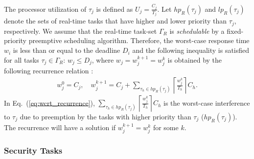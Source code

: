 \documentclass[../rt_server_main.tex]{subfiles}
\begin{document}
The processor utilization of $\tau_j$ is defined as $U_j = \frac{C_j}{T_j}$. Let $hp_R(\tau_j)$ and $lp_R(\tau_j)$ denote the sets of real-time tasks that have higher and lower priority than $\tau_j$, respectively. We assume that the real-time task-set $\Gamma_R$ is \textit{schedulable} by a fixed-priority preemptive scheduling algorithm. Therefore, the worst-case response time %
$w_i$ is less than or equal to the deadline $D_i$ and the following inequality is satisfied for all tasks $\tau_j \in \Gamma_R$:
$w_j \leq D_j$,
where $w_j = w_j^{k+1} = w_j^k$ is obtained by the following recurrence relation \cite{res_time_rts}:
\begin{equation} \label{eq:wcrt_recurrence}
\begin{aligned}
w_j^0 = C_j, \quad %
w_j^{k+1} = C_j + \sum_{\tau_h \in hp_R(\tau_j)} \left\lceil \frac{w_j^k}{T_h} \right\rceil C_h.
\end{aligned}
\end{equation}
In Eq.~(\ref{eq:wcrt_recurrence}), $\sum\limits_{\tau_h \in hp_R(\tau_j)} \left\lceil \frac{w_j^k}{T_h} \right\rceil C_h$ is the worst-case interference to  $\tau_j$ due to preemption by the tasks with higher priority than $\tau_j$ (\eg $hp_R(\tau_j)$). %
The recurrence will have a solution if $w_j^{k+1} = w_j^k$ for some $k$.  

\subsubsection{Security Tasks}


\end{document}
